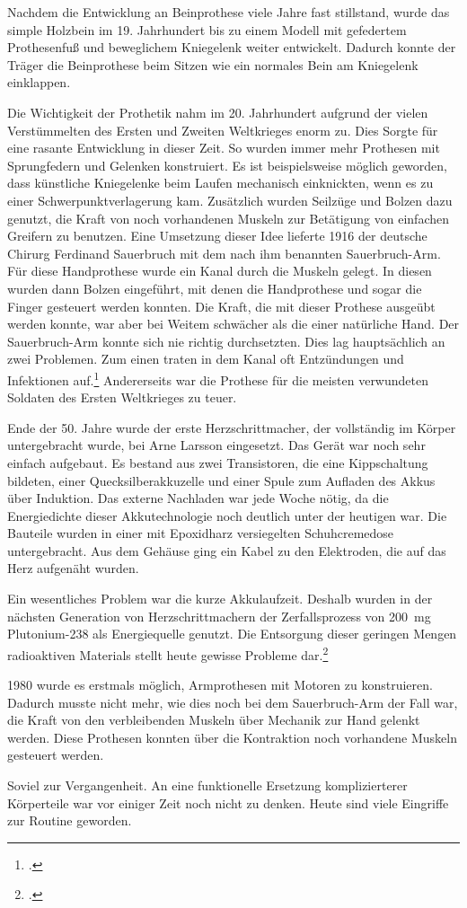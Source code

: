 Nachdem die Entwicklung an Beinprothese viele Jahre fast stillstand, wurde das simple Holzbein im 19.
Jahrhundert bis zu einem Modell mit gefedertem Prothesenfuß und beweglichem Kniegelenk weiter
entwickelt. Dadurch konnte der Träger die Beinprothese beim Sitzen wie ein normales Bein am
Kniegelenk einklappen.

Die Wichtigkeit der Prothetik nahm im 20. Jahrhundert aufgrund der vielen Verstümmelten des Ersten
und Zweiten Weltkrieges enorm zu. Dies Sorgte für eine rasante Entwicklung in dieser Zeit. So wurden
immer mehr Prothesen mit Sprungfedern und Gelenken konstruiert. Es ist beispielsweise möglich
geworden, dass künstliche Kniegelenke beim Laufen mechanisch einknickten, wenn es zu einer
Schwerpunktverlagerung kam. Zusätzlich wurden Seilzüge und Bolzen dazu genutzt, die Kraft von noch
vorhandenen Muskeln zur Betätigung von einfachen Greifern zu benutzen. Eine Umsetzung dieser Idee
lieferte 1916 der deutsche Chirurg Ferdinand Sauerbruch mit dem nach ihm benannten Sauerbruch-Arm.
Für diese Handprothese wurde ein Kanal durch die Muskeln gelegt. In diesen wurden dann Bolzen
eingeführt, mit denen die Handprothese und sogar die Finger gesteuert werden konnten. Die Kraft, die
mit dieser Prothese ausgeübt werden konnte, war aber bei Weitem schwächer als die einer natürliche
Hand. Der Sauerbruch-Arm konnte sich nie richtig durchsetzten. Dies lag hauptsächlich an zwei
Problemen. Zum einen traten in dem Kanal oft Entzündungen und Infektionen
auf.\footcite{thesis:Karpa:Geschichte_Armprothesen}
Andererseits war die
Prothese für die meisten verwundeten Soldaten des Ersten Weltkrieges zu teuer.

Ende der 50. Jahre wurde der erste Herzschrittmacher, der vollständig im Körper untergebracht wurde,
bei Arne Larsson eingesetzt. Das Gerät war noch sehr einfach aufgebaut. Es bestand aus zwei
Transistoren, die eine Kippschaltung bildeten, einer Quecksilberakkuzelle und einer Spule zum
Aufladen des Akkus über Induktion. Das externe Nachladen war jede Woche nötig, da die Energiedichte
dieser Akkutechnologie noch deutlich unter der heutigen war. Die Bauteile wurden in einer mit
Epoxidharz versiegelten Schuhcremedose untergebracht. Aus dem Gehäuse ging ein Kabel zu den
Elektroden, die auf das Herz aufgenäht wurden.

Ein wesentliches Problem war die kurze Akkulaufzeit. Deshalb wurden in der nächsten Generation
von Herzschrittmachern der Zerfallsprozess von \SI{200}{\milli\gram} Plutonium-238 als Energiequelle
genutzt. Die Entsorgung dieser geringen Mengen radioaktiven
Materials stellt heute gewisse Probleme dar.\footcite{DRadio:strahlendes_Herz}

1980 wurde es erstmals möglich, Armprothesen mit Motoren zu konstruieren. Dadurch musste nicht mehr,
wie dies noch bei dem Sauerbruch-Arm der Fall war, die Kraft von den verbleibenden Muskeln über
Mechanik zur Hand gelenkt werden. Diese Prothesen konnten über die Kontraktion noch vorhandene
Muskeln gesteuert werden.

\bigskip
Soviel zur Vergangenheit. An eine funktionelle Ersetzung komplizierterer Körperteile war vor einiger
Zeit noch nicht zu denken. Heute sind viele Eingriffe zur Routine geworden.